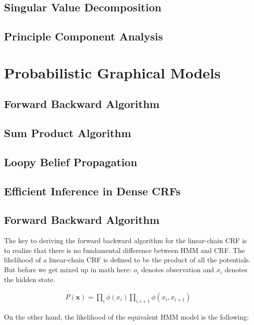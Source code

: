 \documentclass[12pt]{article}
\newcommand{\eq}[1]{\begin{align*}#1\end{align*}}
\begin{document}
\subsection{Singular Value Decomposition}

\subsection{Principle Component Analysis}

\section{Probabilistic Graphical Models}

\subsection{Forward Backward Algorithm}

\subsection{Sum Product Algorithm}

\subsection{Loopy Belief Propagation}

\subsection{Efficient Inference in Dense CRFs}


\subsection{Forward Backward Algorithm}

\renewcommand{\o}{\mathbf{o}}
\newcommand{\x}{\mathbf{x}}

The key to deriving the forward backward algorithm for the linear-chain CRF is to realize that there is no fundamental difference between HMM and CRF.
The likelihood of a linear-chain CRF is defined to be the product of all the potentials. But before we get mixed up in math here: $o_i$ denotes observation and $x_i$ denotes the hidden state.

\eq{
P(\x) = \prod_i \phi(x_i) \prod_{i,i+1} \phi(x_i, x_{i+1})
}

On the other hand, the likelihood of the equivalent HMM model is the following:
\end{document}
